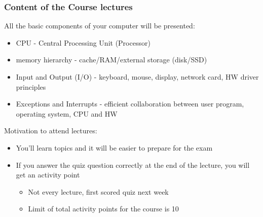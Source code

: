 \documentclass{beamer}
\begin{document}
\begin{frame}
\frametitle{Content of the Course lectures}
All the basic components of your computer will be presented:
\begin{itemize}
\item CPU - Central Processing Unit (Processor)
\item memory hierarchy - cache/RAM/external storage (disk/SSD)
\item Input and Output (I/O) - keyboard, mouse, display, network card, HW driver principles
\item Exceptions and Interrupts - efficient collaboration between user program, operating system, CPU and HW
\end{itemize}

Motivation to attend lectures:
\begin{itemize}
\item You'll learn topics and it will be easier to prepare for the exam
\item If you answer the quiz question correctly at the end of the lecture, you will get an activity point
  \begin{itemize}
  \item Not every lecture, first scored quiz next week
  \item Limit of total activity points for the course is 10
  \end{itemize}
\end{itemize}

\end{frame}
\end{document}
